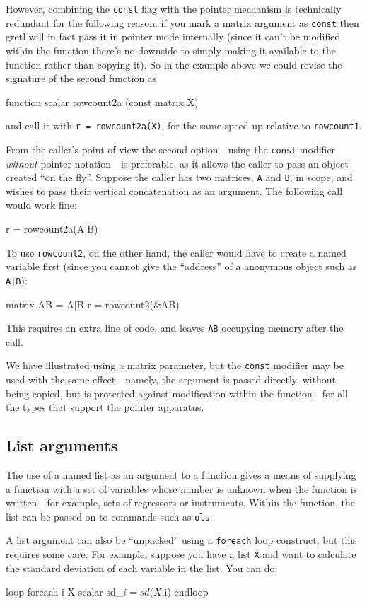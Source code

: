 However, combining the \texttt{const} flag with the pointer mechanism
is technically redundant for the following reason: if you mark a
matrix argument as \texttt{const} then gretl will in fact pass it in
pointer mode internally (since it can't be modified within the
function there's no downside to simply making it available to the
function rather than copying it). So in the example above we could
revise the signature of the second function as
\begin{code}
function scalar rowcount2a (const matrix X)
\end{code}
and call it with \texttt{r = rowcount2a(X)}, for the same speed-up
relative to \texttt{rowcount1}.

From the caller's point of view the second option---using the
\texttt{const} modifier \textit{without} pointer notation---is
preferable, as it allows the caller to pass an object created ``on the
fly''. Suppose the caller has two matrices, \texttt{A} and \texttt{B},
in scope, and wishes to pass their vertical concatenation as an
argument. The following call would work fine:
\begin{code}
r = rowcount2a(A|B)
\end{code}
To use \texttt{rowcount2}, on the other hand, the caller would have to
create a named variable first (since you cannot give the ``address''
of a anonymous object such as \verb+A|B+):
\begin{code}
matrix AB = A|B
r = rowcount2(&AB)
\end{code}
This requires an extra line of code, and leaves \texttt{AB} occupying
memory after the call.

We have illustrated using a matrix parameter, but the \texttt{const}
modifier may be used with the same effect---namely, the argument is
passed directly, without being copied, but is protected against
modification within the function---for all the types that support
the pointer apparatus.

\subsection{List arguments}

The use of a named list as an argument to a function gives a means of
supplying a function with a set of variables whose number is unknown
when the function is written---for example, sets of regressors or
instruments.  Within the function, the list can be passed on to
commands such as \texttt{ols}.

A list argument can also be ``unpacked'' using a \texttt{foreach} loop
construct, but this requires some care.  For example, suppose you have
a list \texttt{X} and want to calculate the standard deviation of each
variable in the list.  You can do:
%
\begin{code}
loop foreach i X
   scalar sd_$i = sd(X.$i)
endloop
\end{code}


